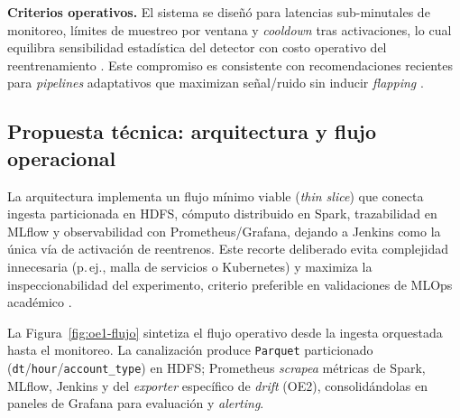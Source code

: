 \textbf{Criterios operativos.}
El sistema se diseñó para latencias sub-minutales de monitoreo, límites de muestreo por ventana y \textit{cooldown} tras activaciones, lo cual equilibra sensibilidad estadística del detector con costo operativo del reentrenamiento \citep{Kodakandla2024}. Este compromiso es consistente con recomendaciones recientes para \textit{pipelines} adaptativos que maximizan señal/ruido sin inducir \textit{flapping} \citep{Berberi2025}.


\subsection{Propuesta técnica: arquitectura y flujo operacional}
La arquitectura implementa un flujo mínimo viable (\textit{thin slice}) que conecta ingesta particionada en HDFS, cómputo distribuido en Spark, trazabilidad en MLflow y observabilidad con Prometheus/Grafana, dejando a Jenkins como la única vía de activación de reentrenos. Este recorte deliberado evita complejidad innecesaria (p.\,ej., malla de servicios o Kubernetes) y maximiza la inspeccionabilidad del experimento, criterio preferible en validaciones de MLOps académico \citep{Berberi2025,Kodakandla2024}.

La Figura~\ref{fig:oe1-flujo} sintetiza el flujo operativo desde la ingesta orquestada hasta el monitoreo. La canalización produce \texttt{Parquet} particionado (\texttt{dt}/\texttt{hour}/\texttt{account\_type}) en HDFS; Prometheus \textit{scrapea} métricas de Spark, MLflow, Jenkins y del \textit{exporter} específico de \textit{drift} (OE2), consolidándolas en paneles de Grafana para evaluación y \textit{alerting}.


